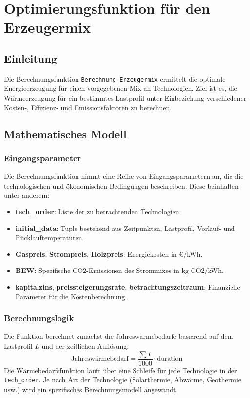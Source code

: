 \section{Optimierungsfunktion für den Erzeugermix}
\label{sec:calculate_mix_doc}

\subsection{Einleitung}
Die Berechnungsfunktion \texttt{Berechnung\_Erzeugermix} ermittelt die optimale Energieerzeugung für einen vorgegebenen Mix an Technologien. Ziel ist es, die Wärmeerzeugung für ein bestimmtes Lastprofil unter Einbeziehung verschiedener Kosten-, Effizienz- und Emissionsfaktoren zu berechnen.

\subsection{Mathematisches Modell}
\subsubsection{Eingangsparameter}
Die Berechnungsfunktion nimmt eine Reihe von Eingangsparametern an, die die technologischen und ökonomischen Bedingungen beschreiben. Diese beinhalten unter anderem:

\begin{itemize}
    \item \textbf{tech\_order}: Liste der zu betrachtenden Technologien.
    \item \textbf{initial\_data}: Tuple bestehend aus Zeitpunkten, Lastprofil, Vorlauf- und Rücklauftemperaturen.
    \item \textbf{Gaspreis}, \textbf{Strompreis}, \textbf{Holzpreis}: Energiekosten in €/kWh.
    \item \textbf{BEW}: Spezifische CO2-Emissionen des Strommixes in kg CO2/kWh.
    \item \textbf{kapitalzins}, \textbf{preissteigerungsrate}, \textbf{betrachtungszeitraum}: Finanzielle Parameter für die Kostenberechnung.
\end{itemize}

\subsubsection{Berechnungslogik}
Die Funktion berechnet zunächst die Jahreswärmebedarfe basierend auf dem Lastprofil \( L \) und der zeitlichen Auflösung:
\[
\text{Jahreswärmebedarf} = \frac{\sum L}{1000} \cdot \text{duration}
\]
Die Wärmebedarfsfunktion läuft über eine Schleife für jede Technologie in der \texttt{tech\_order}. Je nach Art der Technologie (Solarthermie, Abwärme, Geothermie usw.) wird ein spezifisches Berechnungsmodell angewandt.

